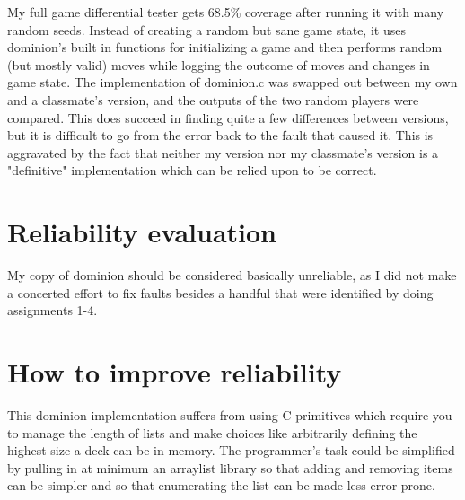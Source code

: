 \documentclass[11pt]{article}
\begin{document}
My full game differential tester gets 68.5\% coverage after running it with many random seeds. Instead of creating a random but sane game state, it uses dominion's built in functions for initializing a game and then performs random (but mostly valid) moves while logging the outcome of moves and changes in game state. The implementation of dominion.c was swapped out between my own and a classmate's version, and the outputs of the two random players were compared. This does succeed in finding quite a few differences between versions, but it is difficult to go from the error back to the fault that caused it. This is aggravated by the fact that neither my version nor my classmate's version is a "definitive" implementation which can be relied upon to be correct.

\section{Reliability evaluation}
My copy of dominion should be considered basically unreliable, as I did not make a concerted effort to fix faults besides a handful that were identified by doing assignments 1-4.

\section{How to improve reliability}
This dominion implementation suffers from using C primitives which require you to manage the length of lists and make choices like arbitrarily defining the highest size a deck can be in memory. The programmer's task could be simplified by pulling in at minimum an arraylist library so that adding and removing items can be simpler and so that enumerating the list can be made less error-prone.
\end{document}
